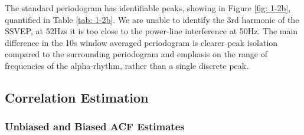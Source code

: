 \documentclass[12pt]{article}
\begin{document}
	The standard periodogram has identifiable peaks, showing in Figure \ref{fig: 1-2b}, quantified in Table \ref{tab: 1-2b}. We are unable to identify the 3rd harmonic of the SSVEP, at 52Hzs it is too close to the power-line interference at 50Hz. The main difference in the 10s window averaged periodogram is clearer peak isolation compared to the surrounding periodogram and emphasis on the range of frequencies of the alpha-rhythm, rather than a single discrete peak.

	\subsection{Correlation Estimation} \label{sec: 1-3-correlation-est}
	
	\subsubsection{Unbiased and Biased ACF Estimates}
	
\end{document}
